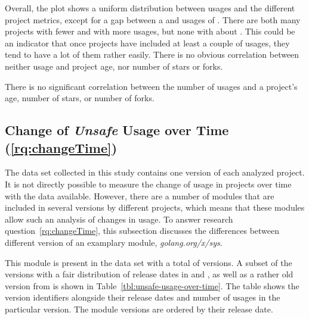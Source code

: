 

Overall, the plot shows a uniform distribution between \unsafe{} usages and the different project metrics, except for
a gap between a  and  usages of \unsafe{}.
There are both many projects with fewer and with more usages, but none with about .
This could be an indicator that once projects have included at least a couple of \unsafe{} usages, they tend to have
a lot of them rather easily.
There is no obvious correlation between neither \unsafe{} usage and project age, nor number of stars or forks.

\begin{answerToRQ}[\ref{rq:popularity}]
    There is no significant correlation between the number of \unsafe{} usages and a project's age, number of stars, or
    number of forks.
\end{answerToRQ}



\subsection{Change of \textit{Unsafe} Usage over Time (\ref{rq:changeTime})}\label{subsec:go-geiger:evaluation:over-time}

The data set collected in this study contains one version of each analyzed project.
It is not directly possible to measure the change of \unsafe{} usage in projects over time with the data available.
However, there are a number of modules that are included in several versions by different projects, which means that
these modules allow such an analysis of changes in \unsafe{} usage.
To answer research question~\ref{rq:changeTime}, this subsection discusses the differences between different version of
an examplary module, \textit{golang.org/x/sys}.

This module is present in the data set with a total of \sysModuleVersions{} versions.
A subset of the versions with a fair distribution of release dates in  and , as well as a
rather old version from  is shown in Table~\ref{tbl:unsafe-usage-over-time}.
The table shows the version identifiers alongside their release dates and number of \unsafe{} usages in the particular
version.
The module versions are ordered by their release date.

